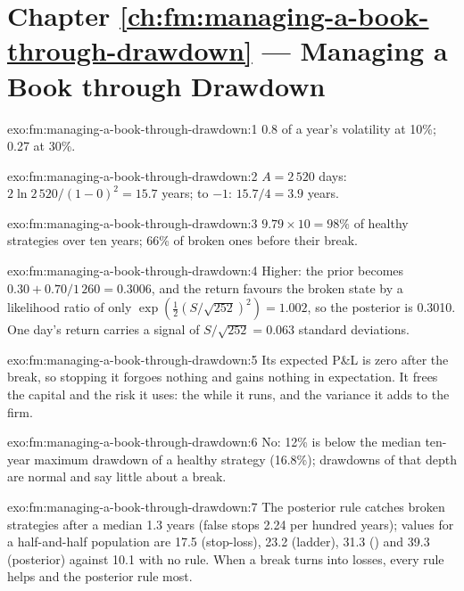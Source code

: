 \section*{Chapter \ref{ch:fm:managing-a-book-through-drawdown} --- Managing a Book through Drawdown}

\begin{solution}{exo:fm:managing-a-book-through-drawdown:1}
0.8 of a year's volatility at 10\%; 0.27 at 30\%.
\end{solution}

\begin{solution}{exo:fm:managing-a-book-through-drawdown:2}
$A=2\,520$ days: $2\ln2\,520/(1-0)^2=15.7$ years; to $-1$: $15.7/4=3.9$ years.
\end{solution}

\begin{solution}{exo:fm:managing-a-book-through-drawdown:3}
$9.79\times10=98\%$ of healthy strategies over ten years; 66\% of broken ones before their break.
\end{solution}

\begin{solution}{exo:fm:managing-a-book-through-drawdown:4}
Higher: the prior becomes $0.30+0.70/1\,260=0.3006$, and the return favours the broken state by a likelihood ratio of only
$\exp(\tfrac12(S/\sqrt{252})^2)=1.002$, so the posterior is 0.3010. One day's return carries a signal of $S/\sqrt{252}=0.063$ standard deviations.
\end{solution}

\begin{solution}{exo:fm:managing-a-book-through-drawdown:5}
Its expected P\&L is zero after the break, so stopping it forgoes nothing and gains nothing in expectation. It frees the capital and the risk it
uses: the  while it runs, and the variance it adds to the firm.
\end{solution}

\begin{solution}{exo:fm:managing-a-book-through-drawdown:6}
No: 12\% is below the median ten-year maximum drawdown of a healthy strategy (16.8\%); drawdowns of that depth are normal and say little about a
break.
\end{solution}

\begin{solution}{exo:fm:managing-a-book-through-drawdown:7}
The posterior rule catches broken strategies after a median 1.3 years (false stops 2.24 per hundred years); values for a half-and-half population
are 17.5 (stop-loss), 23.2 (ladder), 31.3 () and 39.3 (posterior) against 10.1 with no rule. When a break turns into losses, every rule
helps and the posterior rule most.
\end{solution}

